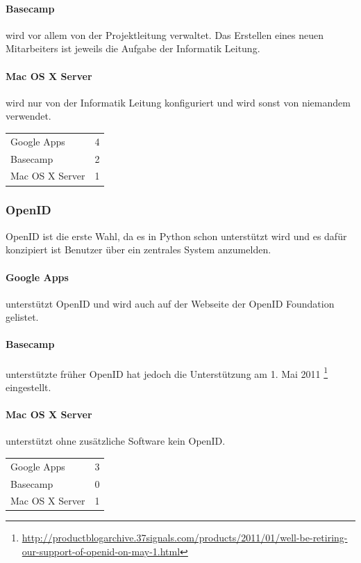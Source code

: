 \paragraph{Basecamp}
\label{par:1.3Basecamp}
wird vor allem von der Projektleitung verwaltet. Das Erstellen eines neuen Mitarbeiters ist jeweils die Aufgabe der Informatik Leitung.
\paragraph{Mac OS X Server}
\label{par:1.3Mac OS X Server}
wird nur von der Informatik Leitung konfiguriert und wird sonst von niemandem verwendet.

\begin{tabular}{lc}
Google Apps & 4\\
Basecamp & 2\\
Mac OS X Server & 1\\
\end{tabular}

\subsubsection{OpenID}
\label{ssub:Bewertung OpenID}
OpenID ist die erste Wahl, da es in Python schon unterstützt wird und es dafür konzipiert ist Benutzer über ein zentrales System anzumelden.
\paragraph{Google Apps}
\label{par:2.1Google Apps}
unterstützt OpenID und wird auch auf der Webseite der OpenID Foundation gelistet.
\paragraph{Basecamp}
\label{par:2.1Basecamp}
unterstützte früher OpenID hat jedoch die Unterstützung am 1. Mai 2011 \footnote{\url{http://productblogarchive.37signals.com/products/2011/01/well-be-retiring-our-support-of-openid-on-may-1.html}} eingestellt.
\paragraph{Mac OS X Server}
\label{par:2.1Mac OS X Server}
unterstützt ohne zusätzliche Software kein OpenID.

\begin{tabular}{lc}
Google Apps & 3\\
Basecamp & 0\\
Mac OS X Server & 1\\
\end{tabular}

